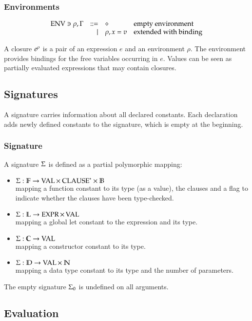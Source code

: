 \subsubsection{Environments}
\[
\begin{array}{lrll}
\operatorname{ENV} \ni \rho, \Gamma & ::= & \diamond & \mbox{empty environment}\\
& \mid & \rho,x = v & \mbox{extended with binding}\\
\end{array}
\]

A closure $e^{\rho}$ is a pair of an expression $e$ and an environment $\rho$.
The environment provides bindings for the free variables occurring in $e$.
Values can be seen as partially evaluated expressions that may contain closures.

\subsection{Signatures}

A signature carries information about all declared constants.
Each declaration adds newly defined constants to the signature, which is empty at the beginning.
\subsubsection{Signature}
A signature $\Sigma$ is defined as a partial polymorphic mapping:
\begin{itemize}
\item
$ \Sigma : \mathbb{F} \rightarrow \operatorname{VAL} \times \: {\operatorname{CLAUSE}}^{\ast} \times \mathbb{B} $\\
mapping a function constant to its type (as a value), the clauses and a flag to indicate whether the clauses have been type-checked.
\item
$ \Sigma : \mathbb{L} \rightarrow \operatorname{EXPR} \times \operatorname{VAL} $\\
mapping a global let constant to the expression and its type. 
\item
$ \Sigma : \mathbb{C} \rightarrow \operatorname{VAL} $\\
mapping a constructor constant to its type.
\item
$ \Sigma : \mathbb{D} \rightarrow \operatorname{VAL} \times \: \mathbb{N} $\\
mapping a data type constant to its type and the number of parameters.
\end{itemize}

\noindent The empty signature $\Sigma_0$ is undefined on all arguments.



\subsection{Evaluation}

